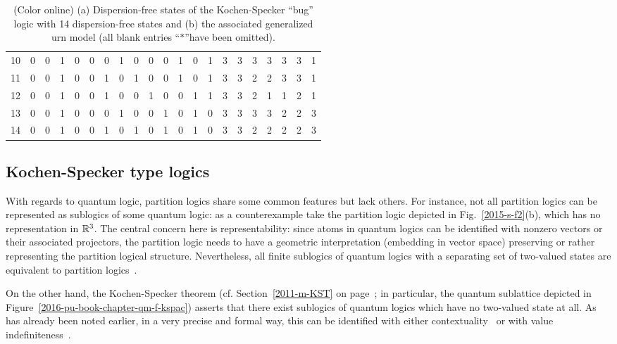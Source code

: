 \begin{table}
{\begin{center}
{{\begin{tabular}{ c ccccccccccccc ccccccc }
10 &0&0&1&0&0&0&1&0&0&0&1&0&1&  \color{green}3&\color{red}3&\color{orange} 3&\color{magenta} 3&\color{gray} 3&\color{blue} 3&\color{cyan}1          \\
11 &0&0&1&0&0&1&0&1&0&0&1&0&1&  \color{green}3&\color{red}3&\color{orange} 2&\color{magenta} 2&\color{gray} 3&\color{blue} 3&\color{cyan}1          \\
12 &0&0&1&0&0&1&0&0&1&0&0&1&1&  \color{green}3&\color{red}3&\color{orange} 2&\color{magenta} 1&\color{gray} 1&\color{blue} 2&\color{cyan}1          \\
13 &0&0&1&0&0&0&1&0&0&1&0&1&0&  \color{green}3&\color{red}3&\color{orange} 3&\color{magenta} 3&\color{gray} 2&\color{blue} 2&\color{cyan}3          \\
14 &0&0&1&0&0&1&0&1&0&1&0&1&0&  \color{green}3&\color{red}3&\color{orange} 2&\color{magenta} 2&\color{gray} 2&\color{blue} 2&\color{cyan}3          \\
\hline\hline
\end{tabular}
} }
\end{center}
}
\caption{(Color online) (a) Dispersion-free states  of the Kochen-Specker ``bug'' logic with 14 dispersion-free states
and  (b) the associated generalized urn model (all blank entries ``$\ast$''have been omitted).
\label{2001-cesena-t2-p}}
\end{table}



\subsection{Kochen-Specker type logics}

With regards to quantum logic,
partition logics share some common features but lack others.
For instance, not all partition logics can be represented as sublogics of some quantum logic:
as a counterexample take the partition logic depicted in Fig.~\ref{2015-s-f2}(b), which has no representation in ${\Bbb R}^3$.
The central concern here is representability: since atoms in quantum logics can be identified with nonzero vectors or their associated projectors,
the partition logic needs to have a geometric interpretation (embedding in vector space) preserving or rather representing the partition logical structure.
Nevertheless, all finite sublogics
of quantum logics with a separating set of two-valued states are equivalent to partition logics~\cite{cheval-or}.

On the other hand, the Kochen-Specker theorem (cf. Section~\ref{2011-m-KST} on page~\pageref{2011-m-KST};
in particular, the quantum sublattice depicted in Figure~\ref{2016-pu-book-chapter-qm-f-kspac})
asserts that there exist sublogics of quantum logics which have no two-valued state at all.
As has already been noted earlier, in a very precise and formal way, this can be identified with
either contextuality~\cite{svozil-2011-enough,svozil_2010-pc09}
or with value indefiniteness~\cite{pitowsky:218,hru-pit-2003}.

